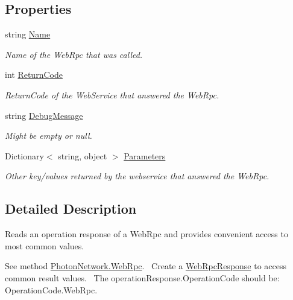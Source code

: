 \subsection*{Properties}
\begin{DoxyCompactItemize}
\item 
string \hyperlink{class_web_rpc_response_ab1431df146dda7dfd8c5771bf592504d}{Name}
\begin{DoxyCompactList}\small\item\em Name of the Web\+Rpc that was called.\end{DoxyCompactList}\item 
int \hyperlink{class_web_rpc_response_ac0f2c0f4cf1ad20705f4bb1cff84461d}{Return\+Code}
\begin{DoxyCompactList}\small\item\em Return\+Code of the Web\+Service that answered the Web\+Rpc. \end{DoxyCompactList}\item 
string \hyperlink{class_web_rpc_response_a328292c9db1a4c5559b00b9e6b7d1b69}{Debug\+Message}
\begin{DoxyCompactList}\small\item\em Might be empty or null.\end{DoxyCompactList}\item 
Dictionary$<$ string, object $>$ \hyperlink{class_web_rpc_response_a7c718bc7f77fa026307ac93f99c81c92}{Parameters}
\begin{DoxyCompactList}\small\item\em Other key/values returned by the webservice that answered the Web\+Rpc.\end{DoxyCompactList}\end{DoxyCompactItemize}


\subsection{Detailed Description}
Reads an operation response of a Web\+Rpc and provides convenient access to most common values. 

See method \hyperlink{class_photon_network_ad9a866c73b3e417d55266ed548a52cb8}{Photon\+Network.\+Web\+Rpc}.~\newline
 Create a \hyperlink{class_web_rpc_response}{Web\+Rpc\+Response} to access common result values.~\newline
 The operation\+Response.\+Operation\+Code should be\+: Operation\+Code.\+Web\+Rpc.~\newline
 


